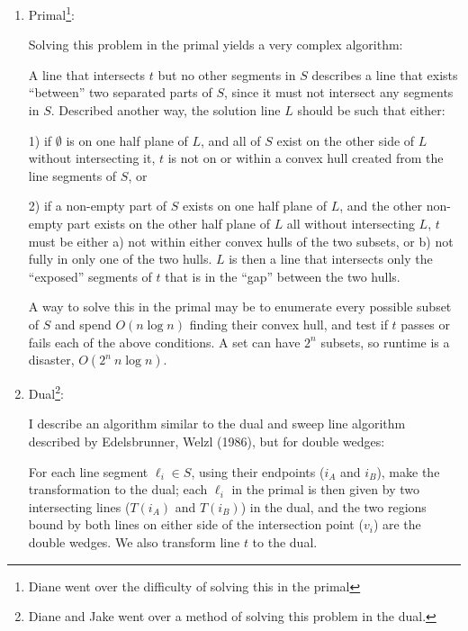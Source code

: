 \documentclass [12pt]{article}
\begin{document}
    \begin{enumerate}[label=\alph*.]
        \item Primal\footnote{Diane went over the difficulty of solving this in the primal}:
        
        Solving this problem in the primal yields a very complex algorithm:

        A line that intersects $t$ but no other segments in $S$ describes a line that exists ``between'' two separated parts of $S$, since it must not intersect any segments in $S$. Described another way, the solution line $L$ should be such that either: 
        
        1) if $\emptyset$ is on one half plane of $L$, and all of $S$ exist on the other side of $L$ without intersecting it, $t$ is not on or within a convex hull created from the line segments of $S$, or 

        2) if a non-empty part of $S$ exists on one half plane of $L$, and the other non-empty part exists on the other half plane of $L$ all without intersecting $L$, $t$ must be either a) not within either convex hulls of the two subsets, or b) not fully in only one of the two hulls. $L$ is then a line that intersects only the ``exposed'' segments of $t$ that is in the ``gap'' between the two hulls. 

        A way to solve this in the primal may be to enumerate every possible subset of $S$ and spend $O(n\log n)$ finding their convex hull, and test if $t$ passes or fails each of the above conditions. A set can have $2^n$ subsets, so runtime is a disaster, $O(2^n\ n \log n)$. 
        
        \item Dual\footnote{Diane and Jake went over a method of solving this problem in the dual.}:
        
        I describe an algorithm similar to the dual and sweep line algorithm described by Edelsbrunner, Welzl (1986), but for double wedges:
        
        For each line segment $\ell_i \in S$, using their endpoints ($i_A$ and $i_B$), make the transformation to the dual; each $\ell_i $ in the primal is then given by two intersecting lines ($T(i_A)$ and $T(i_B)$) in the dual, and the two regions bound by both lines on either side of the intersection point ($v_i$) are the double wedges. We also transform line $t$ to the dual. 


\end{enumerate}
\end{document}
